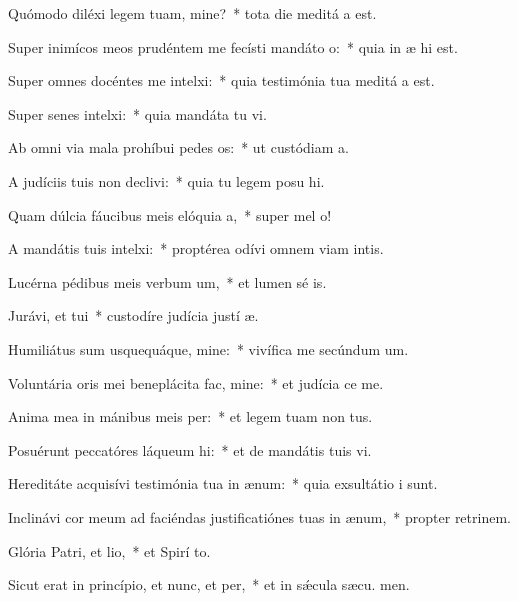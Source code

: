 \item Quómodo diléxi legem tuam, mine?~* tota die meditá a est.
\item Super inimícos meos prudéntem me fecísti mandáto o:~* quia in æ hi est.
\item Super omnes docéntes me intelxi:~* quia testimónia tua meditá a est.
\item Super senes intelxi:~* quia mandáta tu vi.
\item Ab omni via mala prohíbui pedes os:~* ut custódiam  a.
\item A judíciis tuis non declivi:~* quia tu legem posu hi.
\item Quam dúlcia fáucibus meis elóquia a,~* super mel  o!
\item A mandátis tuis intelxi:~* proptérea odívi omnem viam intis.
\item Lucérna pédibus meis verbum um,~* et lumen sé is.
\item Jurávi, et tui~* custodíre judícia justí æ.
\item Humiliátus sum usquequáque, mine:~* vivífica me secúndum  um.
\item Voluntária oris mei beneplácita fac, mine:~* et judícia  ce me.
\item Anima mea in mánibus meis per:~* et legem tuam non  tus.
\item Posuérunt peccatóres láqueum hi:~* et de mandátis tuis  vi.
\item Hereditáte acquisívi testimónia tua in ænum:~* quia exsultátio  i sunt.
\item Inclinávi cor meum ad faciéndas justificatiónes tuas in ænum,~* propter retrinem.
\item Glória Patri, et lio,~* et Spirí to.
\item Sicut erat in princípio, et nunc, et per,~* et in sǽcula sæcu. men.
